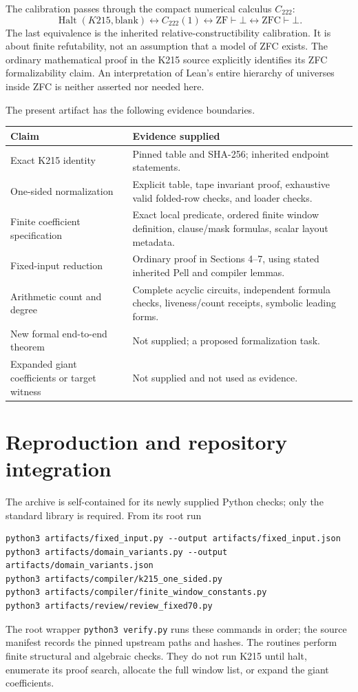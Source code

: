 \documentclass[11pt]{article}
\theoremstyle{definition}
\newcommand{\Halt}{\operatorname{Halt}}
\begin{document}
The calibration passes through the compact numerical calculus $C_{222}$:
\[
 \Halt(K215,\mathrm{blank})
 \longleftrightarrow C_{222}(1)
 \longleftrightarrow \mathrm{ZF}\vdash\bot
 \longleftrightarrow \mathrm{ZFC}\vdash\bot.
\]
The last equivalence is the inherited relative-constructibility calibration.
It is about finite refutability, not an assumption that a model of ZFC exists.
The ordinary mathematical proof in the K215 source explicitly identifies
its ZFC formalizability claim. An interpretation of Lean's entire hierarchy
of universes inside ZFC is neither asserted nor needed here.

The present artifact has the following evidence boundaries.

\begin{center}
\begin{tabular}{p{}p{}}
\toprule
Claim & Evidence supplied\\
\midrule
Exact K215 identity & Pinned table and SHA-256; inherited endpoint statements.\\
One-sided normalization & Explicit table, tape invariant proof, exhaustive
valid folded-row checks, and loader checks.\\
Finite coefficient specification & Exact local predicate, ordered finite
window definition, clause/mask formulas, scalar layout metadata.\\
Fixed-input reduction & Ordinary proof in Sections 4--7, using stated
inherited Pell and compiler lemmas.\\
Arithmetic count and degree & Complete acyclic circuits, independent
formula checks, liveness/count receipts, symbolic leading forms.\\
New formal end-to-end theorem & Not supplied; a proposed formalization task.\\
Expanded giant coefficients or target witness & Not supplied and not
used as evidence.\\
\bottomrule
\end{tabular}
\end{center}

\section{Reproduction and repository integration}

The archive is self-contained for its newly supplied Python checks; only
the standard library is required. From its root run
\begin{lstlisting}
python3 artifacts/fixed_input.py --output artifacts/fixed_input.json
python3 artifacts/domain_variants.py --output artifacts/domain_variants.json
python3 artifacts/compiler/k215_one_sided.py
python3 artifacts/compiler/finite_window_constants.py
python3 artifacts/review/review_fixed70.py
\end{lstlisting}
The root wrapper \texttt{python3 verify.py} runs these commands in order;
the source manifest records the pinned upstream paths and hashes. The routines
perform finite structural and algebraic checks. They do not run K215 until
halt, enumerate its proof search, allocate the full window list, or expand
the giant coefficients.
\end{document}
